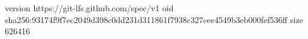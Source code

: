 version https://git-lfs.github.com/spec/v1
oid sha256:93174f9f7ec2049d398c0dd231d311861f7938c327cee4549b3eb000fef536ff
size 626416
